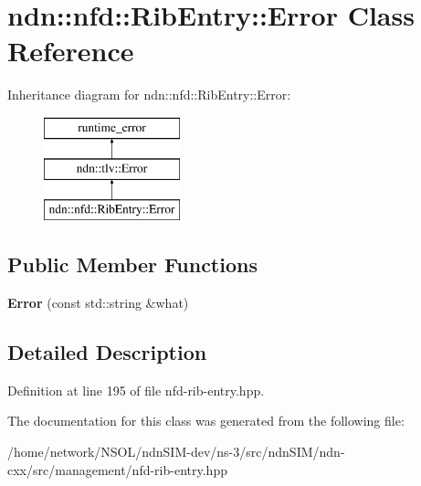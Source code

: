 \hypertarget{classndn_1_1nfd_1_1RibEntry_1_1Error}{}\section{ndn\+:\+:nfd\+:\+:Rib\+Entry\+:\+:Error Class Reference}
\label{classndn_1_1nfd_1_1RibEntry_1_1Error}
Inheritance diagram for ndn\+:\+:nfd\+:\+:Rib\+Entry\+:\+:Error\+:\begin{figure}[H]
\begin{center}
\leavevmode
\includegraphics[height=3.000000cm]{classndn_1_1nfd_1_1RibEntry_1_1Error}
\end{center}
\end{figure}
\subsection*{Public Member Functions}
\begin{DoxyCompactItemize}
\item 
{\bfseries Error} (const std\+::string \&what)\hypertarget{classndn_1_1nfd_1_1RibEntry_1_1Error_a4720e9367be4e5ab116e68491f1ddb39}{}\label{classndn_1_1nfd_1_1RibEntry_1_1Error_a4720e9367be4e5ab116e68491f1ddb39}

\end{DoxyCompactItemize}


\subsection{Detailed Description}


Definition at line 195 of file nfd-\/rib-\/entry.\+hpp.



The documentation for this class was generated from the following file\+:\begin{DoxyCompactItemize}
\item 
/home/network/\+N\+S\+O\+L/ndn\+S\+I\+M-\/dev/ns-\/3/src/ndn\+S\+I\+M/ndn-\/cxx/src/management/nfd-\/rib-\/entry.\+hpp\end{DoxyCompactItemize}
